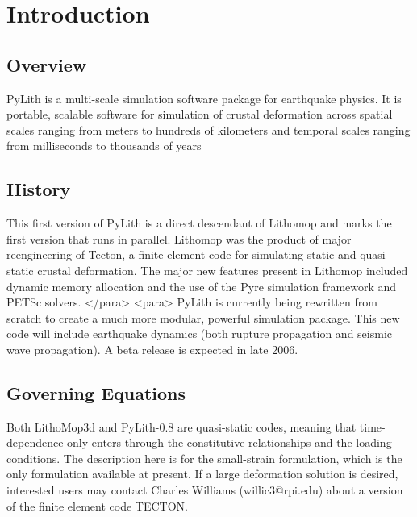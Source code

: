 \chapter{Introduction}

\section{Overview}

PyLith is a multi-scale simulation software package for earthquake
physics. It is portable, scalable software for simulation of crustal
deformation across spatial scales ranging from meters to hundreds of
kilometers and temporal scales ranging from milliseconds to thousands
of years

\section{History}

This first version of PyLith is a direct descendant of Lithomop and
marks the first version that runs in parallel. Lithomop was the
product of major reengineering of Tecton, a finite-element code for
simulating static and quasi-static crustal deformation. The major new
features present in Lithomop included dynamic memory allocation and
the use of the Pyre simulation framework and PETSc solvers. </para>
<para> PyLith is currently being rewritten from scratch to create a
much more modular, powerful simulation package. This new code will
include earthquake dynamics (both rupture propagation and seismic wave
propagation). A beta release is expected in late 2006.

\section{Governing Equations}

Both LithoMop3d and PyLith-0.8 are quasi-static codes, meaning that
time-dependence only enters through the constitutive relationships and
the loading conditions. The description here is for the small-strain
formulation, which is the only formulation available at present. If a
large deformation solution is desired, interested users may contact
Charles Williams (willic3@rpi.edu) about a version of the finite
element code TECTON.

